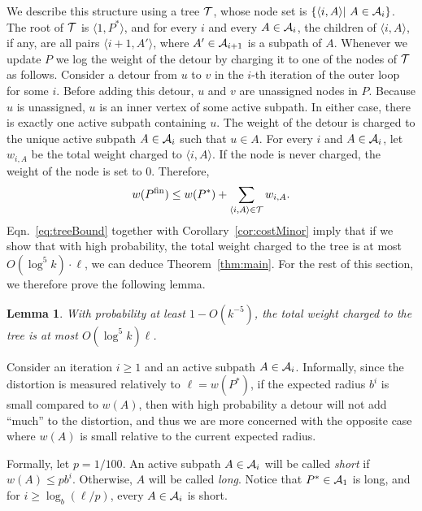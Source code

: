 \documentclass[twoside,leqno,twocolumn]{article}
\newtheorem{lemma}[theorem]{Lemma}
\newcommand{\fin}{{\text{fin}}}
\begin{document}
We describe this structure using a tree ${\cal T}$, whose node set is $\{\langle i, A \rangle | \ A \in {\cal A}_i\}$. The root of ${\cal T}$ is $\langle 1, P^* \rangle$, and for every $i$ and every $A \in {\cal A}_i$, the children of $\langle i,A \rangle$, if any, are all pairs $\langle i+1 ,A'\rangle$, where $A' \in {\cal A}_{i+1}$ is a subpath of $A$.
Whenever we update $P$ we log the weight of the detour by charging it to one of the nodes of ${\cal T}$ as follows. Consider a detour from $u$ to $v$ in the $i$-th iteration of the outer loop for some $i$. Before adding this detour, $u$ and $v$ are unassigned nodes in $P$. Because $u$ is unassigned, $u$ is an inner vertex of some active subpath. In either case, there is exactly one active subpath containing $u$. The weight of the detour is charged to the unique active subpath $A \in {\cal A}_i$ such that $u \in A$. For every $i$ and $A \in {\cal A}_i$, let $w_{i,A}$ be the total weight charged to $\langle i,A \rangle$. If the node is never charged, the weight of the node is set to $0$. Therefore, 
\begin{equation}
w(P^\fin) \le w(P^*) + \sum_{\langle i,A \rangle \in {\cal T}}{w_{i,A}} .
\label{eq:treeBound}
\end{equation}
Eqn.~\eqref{eq:treeBound} together with Corollary~\ref{cor:costMinor} imply that if we show that with high probability, the total weight charged to the tree is at most $O(\log ^5k)\cdot \ell$, we can deduce Theorem~\ref{thm:main}.
For the rest of this section, we therefore prove the following lemma.
\begin{lemma} \label{l:totalWeight}
With probability at least $1 - O(k^{-5})$, the total weight charged to the tree is at most $O(\log ^5 k) \ell$.
\end{lemma}

Consider an iteration $i \ge 1$ and an active subpath $A \in {\cal A}_i$. 
Informally, since the distortion is measured relatively to $\ell = w(P^*)$, 
if the expected radius $b^i$ is small compared to $w(A)$, 
then with high probability a detour will not add ``much'' to the distortion,
and thus we are more concerned with the opposite case 
where $w(A)$ is small relative to the current expected radius.

Formally, let $p = 1/100$. An active subpath $A \in {\cal A}_i$ will be called {\em short} if $w(A) \le pb^i$. Otherwise, $A$ will be called {\em long}. Notice that $P^* \in {\cal A}_1$ is long, and for $i \ge \log_b(\ell/p)$, every $A \in {\cal A}_i$ is short.
\end{document}
